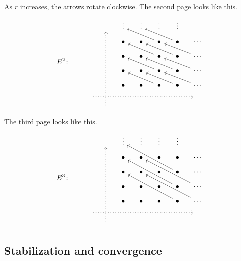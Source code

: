 \documentclass[main.tex]{subfiles}
\begin{document}
As $r$ increases, the arrows rotate clockwise. The second page looks like this.
\begin{equation*}
  E^{2}\colon\qquad
  \begin{tikzcd}[row sep=small, column sep=small]
    & \
    \arrow[dddddd, leftarrow, dotted, at start]
    & \vdots
    & \vdots
    & \vdots
    & \vdots
    \\
    && \bullet
    & \bullet
    & \bullet
    \arrow[ull]
    & \bullet
    \arrow[ull]
    & \cdots
    \\
    && \bullet
    & \bullet
    & \bullet
    \arrow[ull]
    & \bullet
    \arrow[ull]
    & \cdots
    \arrow[ull]
    \\
    && \bullet
    & \bullet
    & \bullet
    \arrow[ull]
    & \bullet
    \arrow[ull]
    & \cdots
    \arrow[ull]
    \\
    && \bullet
    & \bullet
    & \bullet
    \arrow[ull]
    & \bullet
    \arrow[ull]
    & \cdots
    \arrow[ull]
    \\
    \
    \arrow[rrrrrr, dotted, at end]
    &&&&&& \
    \\
    & \
  \end{tikzcd}
\end{equation*}
The third page looks like this.
\begin{equation*}
  E^{3}\colon\qquad
  \begin{tikzcd}[row sep=small, column sep=small]
    & \
    \arrow[dddddd, leftarrow, dotted, at start]
    & \vdots
    & \vdots
    & \vdots
    & \vdots
    \\
    && \bullet
    & \bullet
    & \bullet
    & \bullet
    & \cdots
    \\
    && \bullet
    & \bullet
    & \bullet
    & \bullet
    \arrow[uulll]
    & \cdots
    \\
    && \bullet
    & \bullet
    & \bullet
    & \bullet
    \arrow[uulll]
    & \cdots
    \arrow[uulll]
    \\
    && \bullet
    & \bullet
    & \bullet
    & \bullet
    \arrow[uulll]
    & \cdots
    \arrow[uulll]
    \\
    \
    \arrow[rrrrrr, dotted, at end]
    &&&&&& \
    \\
    & \
  \end{tikzcd}
\end{equation*}

\subsection{Stabilization and convergence}
\label{ssc:stabilization_and_convergence}
\end{document}
